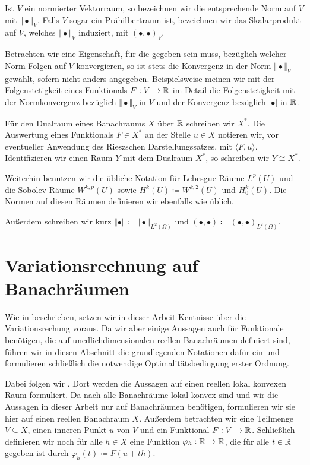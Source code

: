 Ist $V$ ein normierter Vektorraum, so bezeichnen wir die entsprechende Norm auf
$V$ mit $\Vert\bullet\Vert_V$. 
Falls $V$ sogar ein Prähilbertraum ist, bezeichnen wir das Skalarprodukt auf
$V$, welches $\Vert\bullet\Vert_V$ induziert, mit $(\bullet,\bullet)_V$.

Betrachten wir eine Eigenschaft, für die gegeben sein muss, bezüglich welcher
Norm Folgen auf $V$ konvergieren, so ist stets die Konvergenz in der Norm
$\Vert\bullet\Vert_V$ gewählt, sofern nicht anders angegeben.
Beispielsweise meinen wir mit der Folgenstetigkeit eines Funktionals
$F:V\to\mathbb{R}$ im Detail die Folgenstetigkeit mit der Normkonvergenz
bezüglich $\Vert\bullet\Vert_V$ in $V$ und der Konvergenz bezüglich $|\bullet|$
in $\mathbb{R}$.

Für den Dualraum eines Banachraums $X$ über $\mathbb{R}$ 
schreiben wir $X^\ast$. Die Auswertung eines Funktionals $F\in X^\ast$ an
der Stelle $u\in X$ notieren wir, vor eventueller 
Anwendung des Rieszschen Darstellungssatzes, mit $\langle F,u\rangle$.
Identifizieren wir einen Raum $Y$ mit dem Dualraum $X^\ast$, so schreiben
wir $Y\cong X^\ast$.

Weiterhin benutzen wir die übliche Notation für Lebesgue-Räume
$L^p(U)$ und die So\-bo\-lev-Räume $W^{k,p}(U)$ sowie
$H^k(U)\coloneqq W^{k,2}(U)$ und $H^k_0(U)$. Die Normen auf diesen Räumen
definieren wir ebenfalls wie üblich.

Außerdem schreiben wir kurz $\Vert\bullet\Vert \coloneqq
\Vert\bullet\Vert_{L^2(\Omega)}$
und $(\bullet,\bullet)\coloneqq(\bullet,\bullet)_{L^2(\Omega)}$.


\section{Variationsrechnung auf Banachräumen}
\label{sec:variationalCalculus}

Wie in  beschrieben, setzen wir in dieser Arbeit
Kentnisse über die Variationsrechung voraus. 
Da wir aber einige Aussagen auch für Funktionale benötigen, die auf
unedlichdimensionalen reellen Banachräumen definiert sind, führen
wir in diesen Abschnitt die grundlegenden Notationen dafür ein und formulieren
schließlich die notwendige Optimalitätsbedingung erster Ordnung.

Dabei folgen wir \cite[S. 189-194]{Zei85}. 
Dort werden die Aussagen auf einen reellen lokal konvexen
Raum formuliert. Da nach \cite[S. 781, (43)]{Zei86} alle Banachräume 
lokal konvex sind und wir die Aussagen in dieser Arbeit
nur auf Banachräumen benötigen, formulieren wir sie hier auf einen reellen 
Banachraum $X$. 
Außerdem betrachten wir eine Teilmenge $V\subseteq X$, einen
inneren Punkt $u$ von $V$ und ein Funktional $F:V\to\mathbb{R}$. 
Schließlich definieren wir noch für alle $h\in X$ eine Funktion
$\varphi_h:\mathbb{R}\to\mathbb{R}$, die für alle $t\in\mathbb{R}$ gegeben ist durch
$\varphi_h(t)\coloneqq F(u+th)$.

